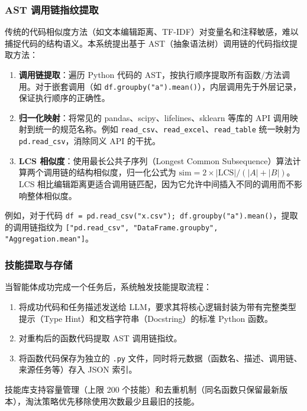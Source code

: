 \subsubsection{AST 调用链指纹提取}

传统的代码相似度方法（如文本编辑距离、TF-IDF）对变量名和注释敏感，难以捕捉代码的结构语义。本系统提出基于 AST（抽象语法树）调用链的代码指纹提取方法：

\begin{enumerate}
    \item \textbf{调用链提取}：遍历 Python 代码的 AST，按执行顺序提取所有函数/方法调用。对于嵌套调用（如 \texttt{df.groupby("a").mean()}），内层调用先于外层记录，保证执行顺序的正确性。
    \item \textbf{归一化映射}：将常见的 pandas、scipy、lifelines、sklearn 等库的 API 调用映射到统一的规范名称。例如 \texttt{read\_csv}、\texttt{read\_excel}、\texttt{read\_table} 统一映射为 \texttt{pd.read\_csv}，消除同义 API 的干扰。
    \item \textbf{LCS 相似度}：使用最长公共子序列（Longest Common Subsequence）算法计算两个调用链的结构相似度，归一化公式为 $\text{sim} = 2 \times |\text{LCS}| / (|A| + |B|)$。LCS 相比编辑距离更适合调用链匹配，因为它允许中间插入不同的调用而不影响整体相似度。
\end{enumerate}

例如，对于代码 \texttt{df = pd.read\_csv("x.csv"); df.groupby("a").mean()}，提取的调用链指纹为 \texttt{["pd.read\_csv", "DataFrame.groupby", "Aggregation.mean"]}。

\subsubsection{技能提取与存储}

当智能体成功完成一个任务后，系统触发技能提取流程：

\begin{enumerate}
    \item 将成功代码和任务描述发送给 LLM，要求其将核心逻辑封装为带有完整类型提示（Type Hint）和文档字符串（Docstring）的标准 Python 函数。
    \item 对重构后的函数代码提取 AST 调用链指纹。
    \item 将函数代码保存为独立的 \texttt{.py} 文件，同时将元数据（函数名、描述、调用链、来源任务等）存入 JSON 索引。
\end{enumerate}

技能库支持容量管理（上限 200 个技能）和去重机制（同名函数只保留最新版本），淘汰策略优先移除使用次数最少且最旧的技能。

